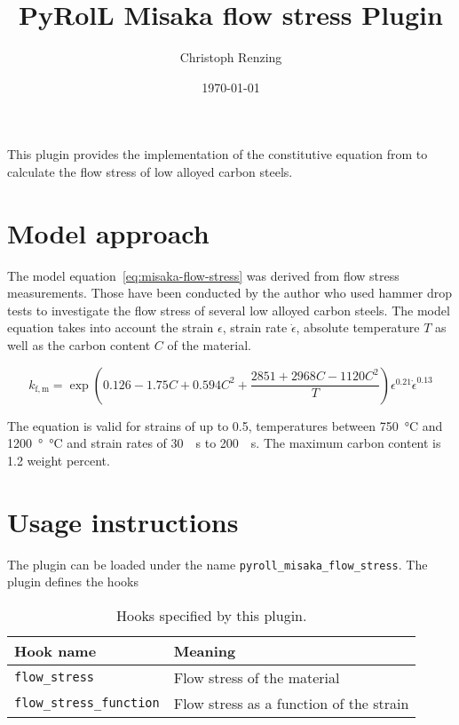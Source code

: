 \documentclass[11pt]{PyRollDocs}
\begin{document}
    \title{PyRolL Misaka flow stress Plugin}
    \author{Christoph Renzing}
    \date{\today}

    \maketitle

    This plugin provides the implementation of the constitutive equation from \textcite{Misaka1967} to calculate the flow stress of low alloyed carbon steels.


    \section{Model approach}\label{sec:model-approach}

    The model equation~\ref{eq:misaka-flow-stress} was derived from flow stress measurements.
    Those have been conducted by the author who used hammer drop tests to investigate the flow stress of several low alloyed carbon steels.
    The model equation  takes into account the strain $\epsilon$, strain rate $\dot{\epsilon}$, absolute temperature $T$ as well as the carbon content $C$ of the material.

    \begin{equation}
        k_{\mathrm{f,m}} = \exp{\left( 0.126 - 1.75 C + 0.594 C^2+ \frac{2851 + 2968 C -1120 C^2}{T} \right)} \epsilon^{0.21} \dot{\epsilon}^{0.13}
        \label{eq:misaka-flow-stress}
    \end{equation}

    The equation is valid for strains of up to 0.5, temperatures between \qty{750}{\celsius} and \qty{1200}{\degree\celsius} and strain rates of \qty{30}{\per\second} to \qty{200}{\per\second}.
    The maximum carbon content is 1.2 weight percent.


    \section{Usage instructions}\label{sec:usage-instructions}

    The plugin can be loaded under the name \texttt{pyroll\_misaka\_flow\_stress}.
    The plugin defines the hooks

    \begin{table}[h]
        \centering
        \caption{Hooks specified by this plugin.}
        \label{tab:hookspecs}
        \begin{tabular}{ll}
            \toprule
            Hook name                       & Meaning                                 \\
            \midrule
            \texttt{flow\_stress}           & Flow stress of the material             \\
            \texttt{flow\_stress\_function} & Flow stress as a function of the strain \\
            \bottomrule
        \end{tabular}
    \end{table}

    \printbibliography
\end{document}
